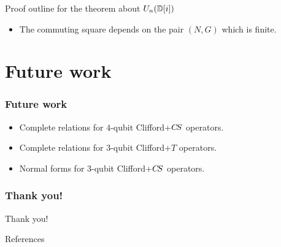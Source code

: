 \documentclass[compress,noamsthm,hyperref={bookmarksopen=true},aspectratio=169]{beamer}
\begin{document}
\begin{frame}[fragile]{Proof outline for the theorem about $U_n({\mathbb D} [i])$}
\begin{itemize}
\begin{minipage}{0.5\textwidth}
\[\begin{tikzpicture}[xscale=1.5,yscale=0.9]
  node(t33) [pos=0.8] {}
  (I);
  \draw [] (t3) edge[-implies,double,bend left=5] (t31);
  \draw [->] (t31) edge[-implies,double,bend left=5] (t32);
  \draw [->] (t32) edge[-implies,double,bend left=5] (t33);
  \draw [->] (t33) edge[-implies,double,bend left=5] (I);
  \path [inner node] (q) edge[bend left,draw=none]
  node(t41) [pos=0.25] {}
  node(t42) [pos=0.55] {}
  node(t43) [pos=0.8] {}
  (I);
  \draw [] (q) edge[-implies,double,bend left=5] (t41);
  \draw [->] (t41) edge[-implies,double,bend left=5] (t42);
  \draw [->] (t42) edge[-implies,double,bend left=5] (t43);
  \draw [->] (t43) edge[-implies,double,bend left=5] (I);
  \node at (0,2.75) {$\simr$};
  \node at (-1.3,1.3) {$\simr$};
  \node at (-0.45,1.3) {$\simr$};
  \node at (0.45,1.3) {$\simr$};
  \node at (1.3,1.3) {$\simr$};
\end{tikzpicture}
  \]
\end{minipage}

\item The commuting square depends on the pair $(N,G)$ which is finite.
\end{itemize}
\end{frame}

\section*{Future work}
\begin{frame}
  \frametitle{Future work}
  \begin{itemize}
    \setlength\itemsep{1.4em}
  \item Complete relations for $4$-qubit Clifford+$C\kern-.16667em S$ operators.
  \item Complete relations for $3$-qubit Clifford+$T$ operators.
  \item Normal forms for $3$-qubit Clifford+$C\kern-.16667em S$ operators.
  \end{itemize}
  
\end{frame}

\begin{frame}
  \frametitle{Thank you!}
  \centering
  \huge Thank you!
\end{frame}

\begin{frame}{References}
\end{frame}
\end{document}
